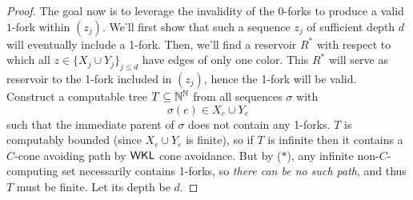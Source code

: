 \documentclass{amsart}
\begin{document}
\begin{proof}
		The goal now is to leverage the invalidity of the $0$-forks to produce a valid $1$-fork within $(z_j)$. We'll first show that such a sequence $z_j$ of sufficient depth $d$ will eventually include a 1-fork. Then, we'll find a reservoir $R^*$ with respect to which all $z\in \{X_j\cup Y_j\}_{j\leq d}$ have edges of only one color. This $R^*$ will serve as reservoir to the 1-fork included in $(z_j)$, hence the 1-fork will be valid.\\
		
			
		
		Construct a computable tree $T\subseteq \mathbb{N}^{\mathbb{N}}$ from all sequences $\sigma$ with
		$$
		\sigma(e) \in X_e\cup Y_e
		$$
		such that the immediate parent of $\sigma$ does not contain any 1-forks. $T$ is computably bounded (since $X_e\cup Y_e$ is finite), so if $T$ is infinite then it contains a $C$-cone avoiding path by $\sf{WKL}$ cone avoidance. But by ($\ast$), any infinite non-$C$-computing set necessarily contains 1-forks, so \textit{there can be no such path}, and thus $T$ must be finite. Let its depth be $d$.
		

\end{proof}
\end{document}
